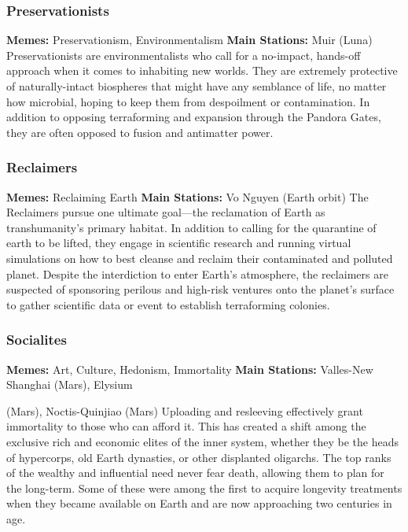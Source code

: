 \subsubsection{Preservationists}

\textbf{Memes:} Preservationism, Environmentalism
\textbf{Main Stations:} Muir (Luna)
Preservationists are environmentalists who call for 
a no-impact, hands-off approach when it comes to 
inhabiting new worlds. They are extremely protective 
of naturally-intact biospheres that might have any 
semblance of life, no matter how microbial, hoping 
to keep them from despoilment or contamination. 
In addition to opposing terraforming and expansion 
through the Pandora Gates, they are often opposed to 
fusion and antimatter power.

\subsubsection{Reclaimers}

\textbf{Memes:} Reclaiming Earth
\textbf{Main Stations:} Vo Nguyen (Earth orbit)
The Reclaimers pursue one ultimate goal—the reclamation of Earth as transhumanity's primary habitat. 
In addition to calling for the quarantine of earth to be 
lifted, they engage in scientific research and running 
virtual simulations on how to best cleanse and reclaim 
their contaminated and polluted planet. Despite the 
interdiction to enter Earth's atmosphere, the reclaimers are suspected of sponsoring perilous and high-risk 
ventures onto the planet's surface to gather scientific 
data or event to establish terraforming colonies.

\subsubsection{Socialites}

\textbf{Memes:} Art, Culture, Hedonism, Immortality
\textbf{Main Stations:} Valles-New Shanghai (Mars), Elysium 

(Mars), Noctis-Quinjiao (Mars)
Uploading and resleeving effectively grant immortality 
to those who can afford it. This has created a shift 
among the exclusive rich and economic elites of the 
inner system, whether they be the heads of hypercorps, 
old Earth dynasties, or other displanted oligarchs. The 
top ranks of the wealthy and influential need never 
fear death, allowing them to plan for the long-term. 
Some of these were among the first to acquire longevity treatments when they became available on Earth 
and are now approaching two centuries in age.

